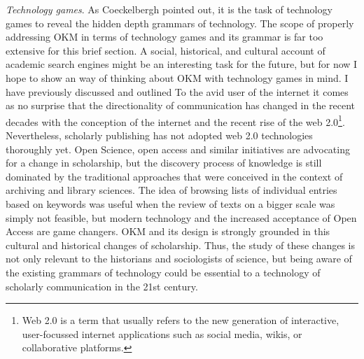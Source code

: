 \textit{Technology games}. As Coeckelbergh pointed out, it is the task of technology games to reveal the hidden depth grammars of technology. The scope of properly addressing OKM in terms of technology games and its grammar is far too extensive for this brief section. A social, historical, and cultural account of academic search engines might be an interesting task for the future, but for now I hope to show an way of thinking about OKM with technology games in mind. I have previously discussed and outlined To the avid user of the internet it comes as no surprise that the directionality of communication has changed in the recent decades with the conception of the internet and the recent rise of the web 2.0\footnote{Web 2.0 is a term that usually refers to the new generation of interactive, user-focussed internet applications such as social media, wikis, or collaborative platforms.}. Nevertheless, scholarly publishing has not adopted web 2.0 technologies thoroughly yet. Open Science, open access and similar initiatives are advocating for a change in scholarship, but the discovery process of knowledge is still dominated by the traditional approaches that were conceived in the context of archiving and library sciences. The idea of browsing lists of individual entries based on keywords was useful when the review of texts on a bigger scale was simply not feasible, but modern technology and the increased acceptance of Open Access are game changers. OKM and its design is strongly grounded in this cultural and historical changes of scholarship. Thus, the study of these changes is not only relevant to the historians and sociologists of science, but being aware of the existing grammars of technology could be essential to a technology of scholarly communication in the 21st century.